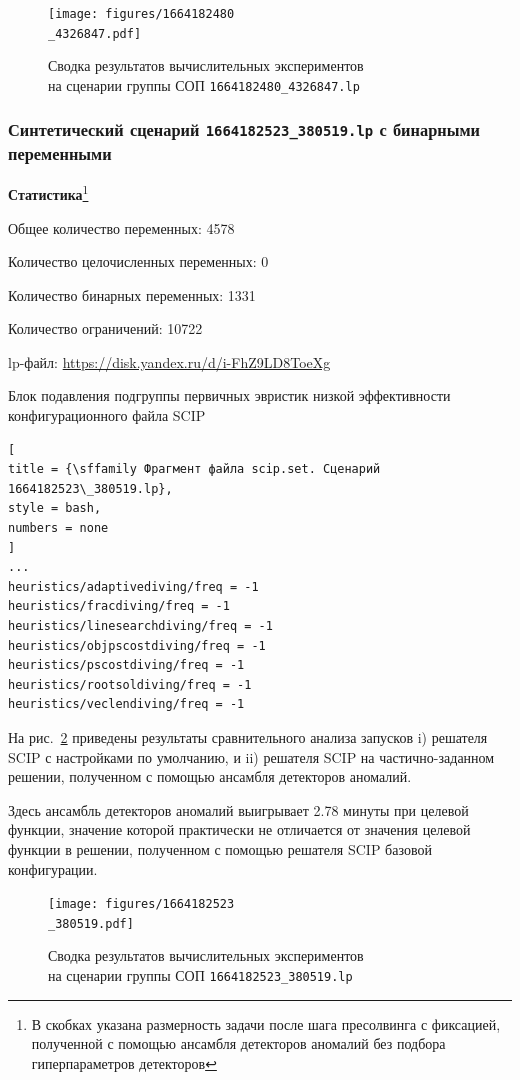 \documentclass[%
	11pt,
	a4paper,
	utf8,
		]{article}
\begin{document}
\begin{figure}[!h]
	\centering
	\texttt{[image: figures/1664182480\\\_4326847.pdf]}
	\caption{ Сводка результатов вычислительных экспериментов \\на сценарии группы СОП \texttt{1664182480\_4326847.lp} }\label{fig:1664182480_4326847}
\end{figure}


\subsubsection{Синтетический сценарий \texttt{1664182523\_380519.lp} с бинарными переменными}

\textbf{Статистика}\footnote{В скобках указана размерность задачи после шага пресолвинга с фиксацией, полученной с помощью ансамбля детекторов аномалий без подбора гиперпараметров детекторов}\vspace*{1mm}

Общее количество переменных: 4578

Количество целочисленных переменных: 0

Количество бинарных переменных: 1331

Количество ограничений: 10722

lp-файл: \url{https://disk.yandex.ru/d/i-FhZ9LD8ToeXg}

Блок подавления подгруппы первичных эвристик низкой эффективности конфигурационного файла SCIP
\begin{lstlisting}[
title = {\sffamily Фрагмент файла scip.set. Сценарий 1664182523\_380519.lp},
style = bash,
numbers = none
]
...
heuristics/adaptivediving/freq = -1
heuristics/fracdiving/freq = -1
heuristics/linesearchdiving/freq = -1
heuristics/objpscostdiving/freq = -1
heuristics/pscostdiving/freq = -1
heuristics/rootsoldiving/freq = -1
heuristics/veclendiving/freq = -1
\end{lstlisting}

На рис.~\ref{fig:1664182523_380519} приведены результаты сравнительного анализа запусков i) решателя SCIP с настройками по умолчанию, и ii) решателя SCIP на частично-заданном решении, полученном с помощью ансамбля детекторов аномалий.

Здесь ансамбль детекторов аномалий выигрывает 2.78 минуты при целевой функции, значение которой практически не отличается от значения целевой функции в решении, полученном с помощью решателя SCIP базовой конфигурации.

\begin{figure}[!h]
	\centering
	\texttt{[image: figures/1664182523\\\_380519.pdf]}
	\caption{ Сводка результатов вычислительных экспериментов \\на сценарии группы СОП \texttt{1664182523\_380519.lp} }\label{fig:1664182523_380519}
\end{figure}
\end{document}
